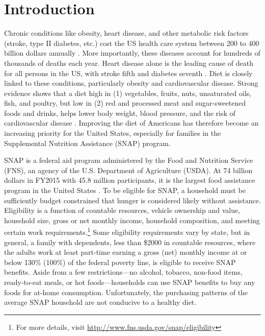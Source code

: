 \documentclass[12pt,letterpaperpaper,]{book}
\begin{document}
\section*{Introduction}\label{intro-1}

Chronic conditions like obesity, heart disease, and other metabolic risk
factors (stroke, type II diabetes, etc.) cost the US health care system
between 200 to 400 billion dollars annually
\citep{cawley_medical_2012, chatterjee_checkup_2014}. More importantly,
these diseases account for hundreds of thousands of deaths each year.
Heart disease alone is the leading cause of death for all persons in the
US, with stroke fifth and diabetes seventh
\citep{national_center_for_health_statistics_health_2015}. Diet is
closely linked to these conditions, particularly obesity and
cardiovascular disease. Strong evidence shows that a diet high in (1)
vegetables, fruits, nuts, unsaturated oils, fish, and poultry, but low
in (2) red and processed meat and sugar-sweetened foods and drinks,
helps lower body weight, blood pressure, and the risk of cardiovascular
disease
\citep{mente_systematic_2009, nutrition_evidence_library_series_2014}.
Improving the diet of Americans has therefore become an increasing
priority for the United States, especially for families in the
Supplemental Nutrition Assistance (SNAP) program.

SNAP is a federal aid program administered by the Food and Nutrition
Service (FNS), an agency of the U.S. Department of Agriculture (USDA).
At 74 billion dollars in FY2015 with 45.8 million participants, it is
the largest food assistance program in the United States
\citep{usda_fns_supplemental_2016}. To be eligible for SNAP, a household
must be sufficiently budget constrained that hunger is considered likely
without assistance. Eligibility is a function of countable resources,
vehicle ownership and value, household size, gross or net monthly
income, household composition, and meeting certain work
requirements.\footnote{For more details, visit
  \url{http://www.fns.usda.gov/snap/eligibility}} Some eligibility
requirements vary by state, but in general, a family with dependents,
less than \$2000 in countable resources, where the adults work at least
part-time earning a gross (net) monthly income at or below 130\% (100\%)
of the federal poverty line, is eligible to receive SNAP benefits. Aside
from a few restrictions---no alcohol, tobacco, non-food items,
ready-to-eat meals, or hot foods---households can use SNAP benefits to
buy any foods for at-home consumption. Unfortunately, the purchasing
patterns of the average SNAP household are not conducive to a healthy
diet.
\end{document}
